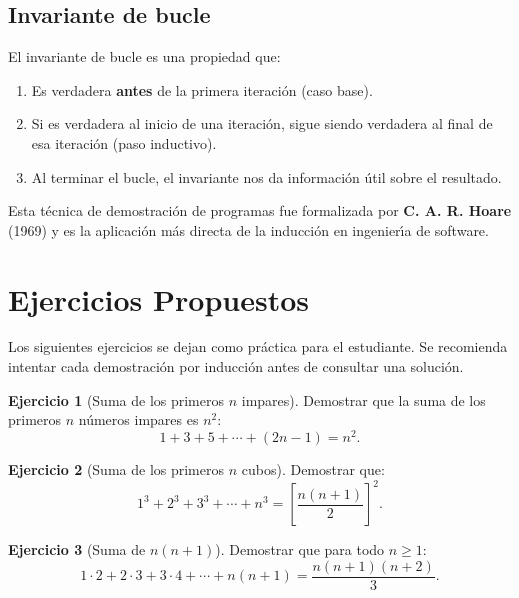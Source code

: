 \documentclass[11pt,a4paper]{article}
\theoremstyle{definition}
\theoremstyle{plain}
\theoremstyle{definition}
\theoremstyle{definition}
\newtheorem{ejercicio}{Ejercicio}[section]
\theoremstyle{remark}
\begin{document}
\subsection{Invariante de bucle}

El invariante de bucle es una propiedad que:
\begin{enumerate}
    \item Es verdadera \textbf{antes} de la primera iteraci\'on (caso base).
    \item Si es verdadera al inicio de una iteraci\'on, sigue siendo verdadera
          al final de esa iteraci\'on (paso inductivo).
    \item Al terminar el bucle, el invariante nos da informaci\'on \'util sobre
          el resultado.
\end{enumerate}
Esta t\'ecnica de demostraci\'on de programas fue formalizada por
\textbf{C. A. R. Hoare} (1969) y es la aplicaci\'on m\'as directa de la
inducci\'on en ingenier\'{\i}a de software.

\section{Ejercicios Propuestos}

Los siguientes ejercicios se dejan como pr\'actica para el estudiante.
Se recomienda intentar cada demostraci\'on por inducci\'on antes de consultar
una soluci\'on.

\begin{ejercicio}[Suma de los primeros $n$ impares]
\label{ej:impares}
Demostrar que la suma de los primeros $n$ n\'umeros impares es $n^{2}$:
\[
1 + 3 + 5 + \cdots + (2n-1) = n^{2}.
\]
\end{ejercicio}

\begin{ejercicio}[Suma de los primeros $n$ cubos]
\label{ej:cubos}
Demostrar que:
\[
1^{3} + 2^{3} + 3^{3} + \cdots + n^{3} =
\left[\frac{n(n+1)}{2}\right]^{2}.
\]
\end{ejercicio}

\begin{ejercicio}[Suma de $n(n+1)$]
\label{ej:sumann1}
Demostrar que para todo $n \geq 1$:
\[
1\cdot 2 + 2\cdot 3 + 3\cdot 4 + \cdots + n(n+1) =
\frac{n(n+1)(n+2)}{3}.
\]
\end{ejercicio}
\end{document}
